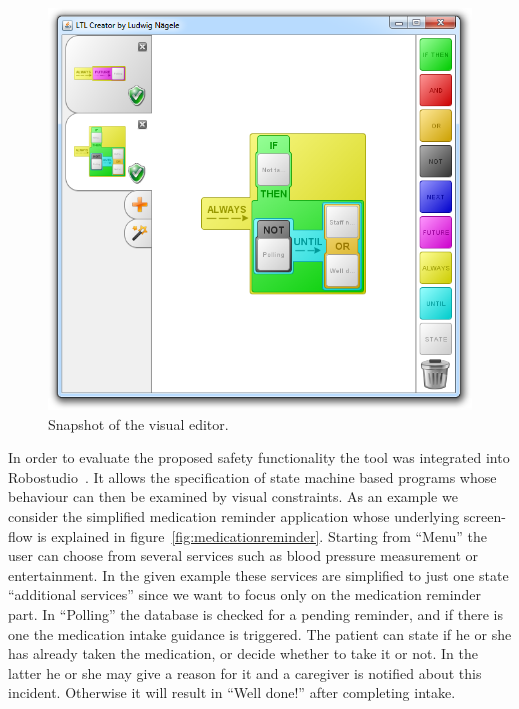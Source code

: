 \documentclass[conference]{IEEEtran}
\begin{document}
\begin{figure}[htbp]
  \centering
  \includegraphics[width=\linewidth]{editor} 
  \caption{Snapshot of the visual editor.}
  \label{fig:editor}
\end{figure}

In order to evaluate the proposed safety functionality the tool was integrated into Robostudio~\cite{robostudio}. It allows the specification of state machine based programs whose behaviour can then be examined by visual constraints. As an example we consider the simplified medication reminder application whose underlying screen-flow is explained in figure~\ref{fig:medicationreminder}. Starting from ``Menu'' the user can choose from several services such as blood pressure measurement or entertainment. In the given example these services are simplified to just one state ``additional services'' since we want to focus only on the medication reminder part. In ``Polling'' the database is checked for a pending reminder, and if there is one the medication intake guidance is triggered. The patient can state if he or she has already taken the medication, or decide whether to take it or not. In the latter he or she may give a reason for it and a caregiver is notified about this incident. Otherwise it will result in ``Well done!'' after completing intake.
\end{document}
